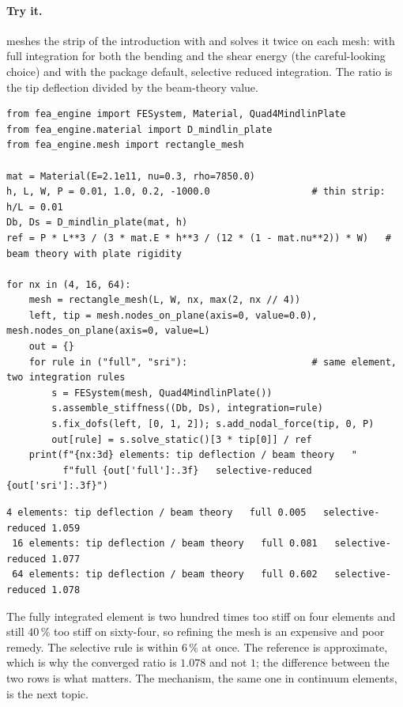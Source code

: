 \paragraph{Try it.}  meshes the strip of the introduction with  and solves it twice on each mesh: with full integration for both the bending and the shear energy (the careful-looking choice) and with the package default, selective reduced integration. The ratio is the tip deflection divided by the beam-theory value.

\begin{lstlisting}[caption={A thin cantilever strip with two integration rules for the same plate element (run with the package on the path).},label={lst:el-try}]
from fea_engine import FESystem, Material, Quad4MindlinPlate
from fea_engine.material import D_mindlin_plate
from fea_engine.mesh import rectangle_mesh

mat = Material(E=2.1e11, nu=0.3, rho=7850.0)
h, L, W, P = 0.01, 1.0, 0.2, -1000.0                  # thin strip: h/L = 0.01
Db, Ds = D_mindlin_plate(mat, h)
ref = P * L**3 / (3 * mat.E * h**3 / (12 * (1 - mat.nu**2)) * W)   # beam theory with plate rigidity

for nx in (4, 16, 64):
    mesh = rectangle_mesh(L, W, nx, max(2, nx // 4))
    left, tip = mesh.nodes_on_plane(axis=0, value=0.0), mesh.nodes_on_plane(axis=0, value=L)
    out = {}
    for rule in ("full", "sri"):                      # same element, two integration rules
        s = FESystem(mesh, Quad4MindlinPlate())
        s.assemble_stiffness((Db, Ds), integration=rule)
        s.fix_dofs(left, [0, 1, 2]); s.add_nodal_force(tip, 0, P)
        out[rule] = s.solve_static()[3 * tip[0]] / ref
    print(f"{nx:3d} elements: tip deflection / beam theory   "
          f"full {out['full']:.3f}   selective-reduced {out['sri']:.3f}")
\end{lstlisting}

\begin{lstlisting}[numbers=none,language={},keywordstyle={},commentstyle={},frame=single,aboveskip=2pt]
  4 elements: tip deflection / beam theory   full 0.005   selective-reduced 1.059
 16 elements: tip deflection / beam theory   full 0.081   selective-reduced 1.077
 64 elements: tip deflection / beam theory   full 0.602   selective-reduced 1.078
\end{lstlisting}

The fully integrated element is two hundred times too stiff on four elements and still $40\,\%$ too stiff on sixty-four, so refining the mesh is an expensive and poor remedy. The selective rule is within $6\,\%$ at once. The reference is approximate, which is why the converged ratio is $1.078$ and not $1$; the difference between the two rows is what matters. The mechanism, the same one in continuum elements, is the next topic.

